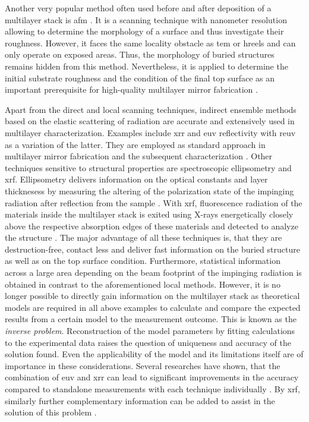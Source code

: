 Another very popular method often used before and after deposition of a multilayer stack is \gls{afm} \cite{binnig_atomic_1986}. It is a scanning technique with nanometer resolution allowing to determine the morphology of a surface and thus investigate their roughness. However, it faces the same locality obstacle as \gls{tem} or \gls{hreels} and can only operate on exposed areas. Thus, the morphology of buried structures remains hidden from this method. Nevertheless, it is applied to determine the initial substrate roughness and the condition of the final top surface as an important prerequisite for high-quality multilayer mirror fabrication \cite{louis_progress_2000, bajt_investigation_2001}.

Apart from the direct and local scanning techniques, indirect ensemble methods based on the elastic scattering of radiation are accurate and extensively used in multilayer characterization. Examples include \gls{xrr} and \gls{euv} reflectivity with \gls{reuv} as a variation of the latter. They are employed as standard approach in multilayer mirror fabrication and the subsequent characterization \cite{lim_fabrication_2001, bajt_investigation_2001, braun_mo/si_2002}. Other techniques sensitive to structural properties are spectroscopic ellipsometry and \Gls{xrf}. Ellipsometry delivers information on the optical constants and layer thicknesess by measuring the altering of the polarization state of the impinging radiation after reflection from the sample \cite{arwin_unambiguous_1984, liu_thickness_1999}. With \gls{xrf}, fluorescence radiation of the materials inside the multilayer stack is exited using X-rays energetically closely above the respective absorption edges of these materials and detected to analyze the structure \cite{kortright_standing_1987, kawamura_interface_1994}. The major advantage of all these techniques is, that they are destruction-free, contact less and deliver fast information on the buried structure as well as on the top surface condition. Furthermore, statistical information across a large area depending on the beam footprint of the impinging radiation is obtained in contrast to the aforementioned local methods. However, it is no longer possible to directly gain information on the multilayer stack as theoretical models are required in all above examples to calculate and compare the expected results from a certain model to the measurement outcome. This is known as the \emph{inverse problem}. Reconstruction of the model parameters by fitting calculations to the experimental data raises the question of uniqueness and accuracy of the solution found. Even the applicability of the model and its limitations itself are of importance in these considerations. Several researches have shown, that the combination of \gls{euv} and \gls{xrr} can lead to significant improvements in the accuracy compared to standalone measurements with each technique individually \cite{yakunin_combined_2014}. By \Gls{xrf}, similarly further complementary information can be added to assist in the solution of this problem \cite{ghose_x-ray_2001}.

